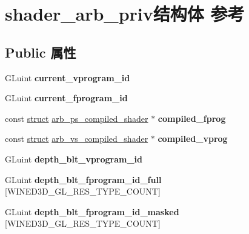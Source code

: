\hypertarget{structshader__arb__priv}{}\section{shader\+\_\+arb\+\_\+priv结构体 参考}
\label{structshader__arb__priv}
\subsection*{Public 属性}
\begin{DoxyCompactItemize}
\item 
\mbox{\label{structshader__arb__priv_a24c9e528e70488303f642f65e3108da3}} 
G\+Luint {\bfseries current\+\_\+vprogram\+\_\+id}
\item 
\mbox{\label{structshader__arb__priv_a58a08cab63c0f6f2e277b4ae33bd67da}} 
G\+Luint {\bfseries current\+\_\+fprogram\+\_\+id}
\item 
\mbox{\label{structshader__arb__priv_a06b39fc1f7f268617bf79dd39e91d4b3}} 
const \hyperlink{interfacestruct}{struct} \hyperlink{structarb__ps__compiled__shader}{arb\+\_\+ps\+\_\+compiled\+\_\+shader} $\ast$ {\bfseries compiled\+\_\+fprog}
\item 
\mbox{\label{structshader__arb__priv_a0fd294084c14fefa0b64ac0a08c677f8}} 
const \hyperlink{interfacestruct}{struct} \hyperlink{structarb__vs__compiled__shader}{arb\+\_\+vs\+\_\+compiled\+\_\+shader} $\ast$ {\bfseries compiled\+\_\+vprog}
\item 
\mbox{\label{structshader__arb__priv_a553a0e2d44dee384ae5173a1499740f6}} 
G\+Luint {\bfseries depth\+\_\+blt\+\_\+vprogram\+\_\+id}
\item 
\mbox{\label{structshader__arb__priv_a74cdb81f4a8737ce61e9be04937d9d2d}} 
G\+Luint {\bfseries depth\+\_\+blt\+\_\+fprogram\+\_\+id\+\_\+full} \mbox{[}W\+I\+N\+E\+D3\+D\+\_\+\+G\+L\+\_\+\+R\+E\+S\+\_\+\+T\+Y\+P\+E\+\_\+\+C\+O\+U\+NT\mbox{]}
\item 
\mbox{\label{structshader__arb__priv_a9f5a61c841fbf8ca414d73582e367e91}} 
G\+Luint {\bfseries depth\+\_\+blt\+\_\+fprogram\+\_\+id\+\_\+masked} \mbox{[}W\+I\+N\+E\+D3\+D\+\_\+\+G\+L\+\_\+\+R\+E\+S\+\_\+\+T\+Y\+P\+E\+\_\+\+C\+O\+U\+NT\mbox{]}

\end{DoxyCompactItemize}
